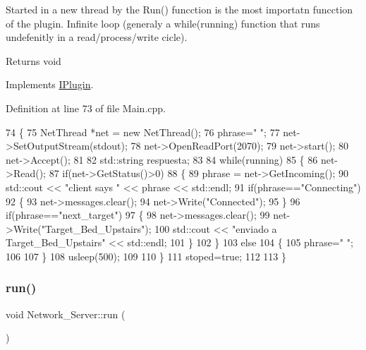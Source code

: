 Started in a new thread by the Run() funcction is the most importatn funcction of the plugin. Infinite loop (generaly a while(running) function that runs undefenitly in a read/process/write cicle). \begin{DoxyReturn}{Returns}
void 
\end{DoxyReturn}


Implements \hyperlink{class_i_plugin_ab5fdb3b0f7afdcee04324dca01766749}{I\+Plugin}.



Definition at line 73 of file Main.\+cpp.


\begin{DoxyCode}
74 \{
75     NetThread *net = \textcolor{keyword}{new} NetThread();
76     phrase=\textcolor{stringliteral}{" "};
77     net->SetOutputStream(stdout);
78     net->OpenReadPort(2070);
79     net->start();
80     net->Accept();
81 
82     std::string respuesta;
83     
84     \textcolor{keywordflow}{while}(running)
85     \{
86         net->Read();
87         \textcolor{keywordflow}{if}(net->GetStatus()>0)
88         \{
89             phrase = net->GetIncoming();
90             std::cout << \textcolor{stringliteral}{"client says "} << phrase << std::endl;
91             \textcolor{keywordflow}{if}(phrase==\textcolor{stringliteral}{"Connecting"})
92             \{
93                 net->messages.clear();
94                 net->Write(\textcolor{stringliteral}{"Connected"});
95             \}
96             \textcolor{keywordflow}{if}(phrase==\textcolor{stringliteral}{"next\_target"})
97             \{
98                 net->messages.clear();
99                 net->Write(\textcolor{stringliteral}{"Target\_Bed\_Upstairs"});
100                 std::cout << \textcolor{stringliteral}{"enviado a Target\_Bed\_Upstairs"} << std::endl;
101             \}
102         \}
103         \textcolor{keywordflow}{else}
104         \{
105             phrase=\textcolor{stringliteral}{" "};
106             
107         \}
108         usleep(500);
109         
110     \}
111     stoped=\textcolor{keyword}{true};
112 
113 \}
\end{DoxyCode}
\mbox{\label{class_network___server_ac8778efb5b94041cafa3e57d57e8d9a2}} 
\subsubsection{\texorpdfstring{run()}{run()}}
{\footnotesize\ttfamily void Network\+\_\+\+Server\+::run (\begin{DoxyParamCaption}{ }\end{DoxyParamCaption})\hspace{0.3cm}{\ttfamily [virtual]}}



